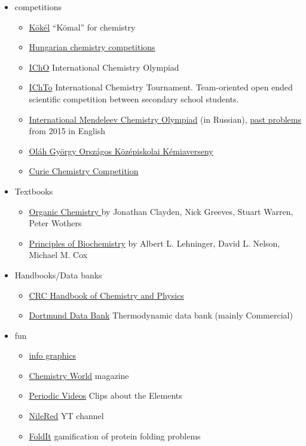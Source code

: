 \documentclass{article}
\begin{document}
\begin{itemize}
    \item competitions
    \begin{itemize}
        \item \href{http://www.kokel.mke.org.hu/}{Kökél} ``Kömal'' for chemistry
        \item \href{http://kemia.apaczai.elte.hu/versenyek/index.htm}{Hungarian chemistry competitions}
        \item \href{https://www.icho.sk/}{IChO} International Chemistry Olympiad
        \item \href{http://ichto.org/en/about/}{IChTo} International Chemistry Tournament.  Team-oriented open ended scientific competition between secondary school students.
        \item \href{http://www.chem.msu.ru/rus/olimp/welcome.html}{International Mendeleev Chemistry Olympiad} (in Russian), \href{https://www.eko.ut.ee/mko/}{past problems} from 2015 in English 
        \item \href{https://olahverseny.szasz.bme.hu/}{Oláh György Országos Középiskolai Kémiaverseny}
        \item \href{http://curiealapitvany.hu/}{Curie Chemistry Competition}
    \end{itemize}
    \item Textbooks
    \begin{itemize}
        \item \href{https://www.goodreads.com/en/book/show/1957892.Organic_Chemistry}{Organic Chemistry }  by Jonathan Clayden, Nick Greeves, Stuart Warren, Peter Wothers
        \item \href{https://www.goodreads.com/book/show/239513.Principles_of_Biochemistry}{Principles of Biochemistry}  by Albert L. Lehninger, David L. Nelson, Michael M. Cox
    \end{itemize}
    \item Handbooks/Data banks
    \begin{itemize}
        \item \href{https://en.wikipedia.org/wiki/CRC_Handbook_of_Chemistry_and_Physics}{CRC Handbook of Chemistry and Physics}
        \item \href{http://www.ddbst.com/}{Dortmund Data Bank} Thermodynamic data bank (mainly Commercial)
    \end{itemize}
    
    \item fun
    \begin{itemize}
        \item \href{https://www.compoundchem.com/}{info graphics}
        \item \href{https://www.chemistryworld.com/}{Chemistry World} magazine
        \item \href{http://www.periodicvideos.com/}{Periodic Videos} Clips about the Elements
        \item \href{https://www.youtube.com/user/TheRedNile}{NileRed} YT channel
        \item \href{https://fold.it/}{FoldIt} gamification of protein folding problems
    \end{itemize}
    

\end{itemize}
\end{document}
